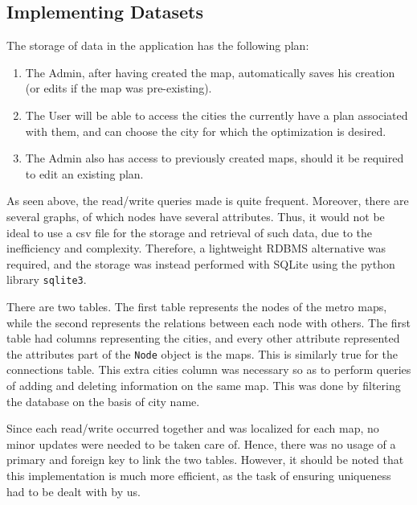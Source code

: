 \documentclass[fontsize=11pt]{article}
\begin{document}
    \subsection*{Implementing Datasets}
	The storage of data in the application has the following plan:
	
	\begin{enumerate}
		\item The Admin, after having created the map, automatically saves his creation (or edits if the map was pre-existing).
		
		\item The User will be able to access the cities the currently have a plan associated with them, and can choose the city for which the optimization is desired.
		
		\item The Admin also has access to previously created maps, should it be required to edit an existing plan.
	\end{enumerate}

	As seen above, the read/write queries made is quite frequent. Moreover, there are several graphs, of which nodes have several attributes. Thus, it would not be ideal to use a csv file for the storage and retrieval of such data, due to the inefficiency and complexity. Therefore, a lightweight RDBMS alternative was required, and the storage was instead performed with SQLite using the python library \texttt{sqlite3}.
	
	 There are two tables. The first table represents the nodes of the metro maps, while the second represents the relations between each node with others. The first table had columns representing the cities, and every other attribute represented the attributes part of the \texttt{Node} object is the maps. This is similarly true for the connections table. This extra cities column was necessary so as to perform queries of adding and deleting information on the same map. This was done by filtering the database on the basis of city name.
	 
	 Since each read/write occurred together and was localized for each map,  no minor updates were needed to be taken care of. Hence, there was no usage of a primary and foreign key to link the two tables. However, it should be noted that this implementation is much more efficient, as the task of ensuring uniqueness had to be dealt with by us. 
\end{document}
